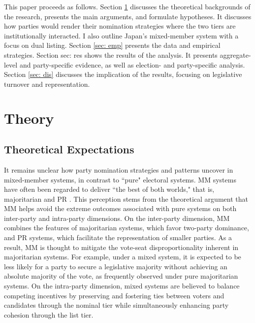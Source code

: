 \documentclass[a4paper, 11pt]{article}
\begin{document}
This paper proceeds as follows. Section \ref{sec: the} discusses the theoretical backgrounds of the research, presents the main arguments, and formulate hypotheses. It discusses how parties would render their nomination strategies where the two tiers are institutionally interacted. I also outline Japan's mixed-member system with a focus on dual listing. Section \ref{sec: emp} presents the data and empirical strategies. Section {sec: res} shows the results of the analysis. It presents aggregate-level and party-specific evidence, as well as election- and party-specific analysis. Section \ref{sec: dis} discusses the implication of the results, focusing on legislative turnover and representation. 

\section{Theory} \label{sec: the}

\subsection{Theoretical Expectations}

It remains unclear how party nomination strategies and patterns uncover in mixed-member systems, in contrast to ``pure" electoral systems. MM systems have often been regarded to deliver ``the best of both worlds," that is, majoritarian and PR \citep{shugartMixedmemberElectoralSystems2003, hiranoPolicyPositionsMixed2011}. This perception stems from the theoretical argument that MM helps avoid the extreme outcomes associated with pure systems on both inter-party and intra-party dimensions. On the inter-party dimension, MM combines the features of majoritarian systems, which favor two-party dominance, and PR systems, which facilitate the representation of smaller parties. As a result, MM is thought to mitigate the vote-seat disproportionality inherent in majoritarian systems. For example, under a mixed system, it is expected to be less likely for a party to secure a legislative majority without achieving an absolute majority of the vote, as frequently observed under pure majoritarian systems. On the intra-party dimension, mixed systems are believed to balance competing incentives by preserving and fostering ties between voters and candidates through the nominal tier while simultaneously enhancing party cohesion through the list tier.
\end{document}
